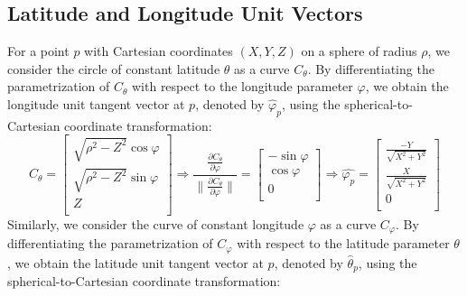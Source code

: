 \documentclass[acmsmall, screen]{acmart}
\begin{document}
\subsection{Latitude and Longitude Unit Vectors}\label{appendix:geomCalc:latlon}
For a point $p$ with Cartesian coordinates $(X, Y, Z)$ on a sphere of radius $\rho$, we consider the circle of constant latitude $\theta$ as a curve $C_{\theta}$. By differentiating the parametrization of $C_{\theta}$ with respect to the longitude parameter $\varphi$, we obtain the longitude unit tangent vector at $p$, denoted by $\hat{\varphi}_p$, using the spherical-to-Cartesian coordinate transformation:
\begin{equation}\label{appendix:geomCalc:latlon:lon}
    C_{\theta} = 
    \begin{bmatrix}
    \sqrt{\rho^2-Z^2} \cos{\varphi} \\
    \sqrt{\rho^2-Z^2} \sin{\varphi} \\
    Z \\
    \end{bmatrix} \Longrightarrow
    \frac{\frac{\partial C_{\theta}}{\partial \varphi}}{\|\frac{\partial C_{\theta}}{\partial \varphi}\|} = 
    \begin{bmatrix}
    - \sin{\varphi} \\
    \cos{\varphi} \\
    0 \\
    \end{bmatrix} \Longrightarrow \hat{\varphi_p} = 
    \begin{bmatrix}
    \frac{-Y}{\sqrt{X^2+Y^2}} \\
    \frac{X}{\sqrt{X^2+Y^2}} \\
    0 \\
    \end{bmatrix}
\end{equation}
Similarly, we consider the curve of constant longitude $\varphi$ as a curve $C_{\varphi}$. By differentiating the parametrization of $C_{\varphi}$ with respect to the latitude parameter $\theta$, we obtain the latitude unit tangent vector at $p$, denoted by $\hat{\theta}_p$, using the spherical-to-Cartesian coordinate transformation:
\end{document}
